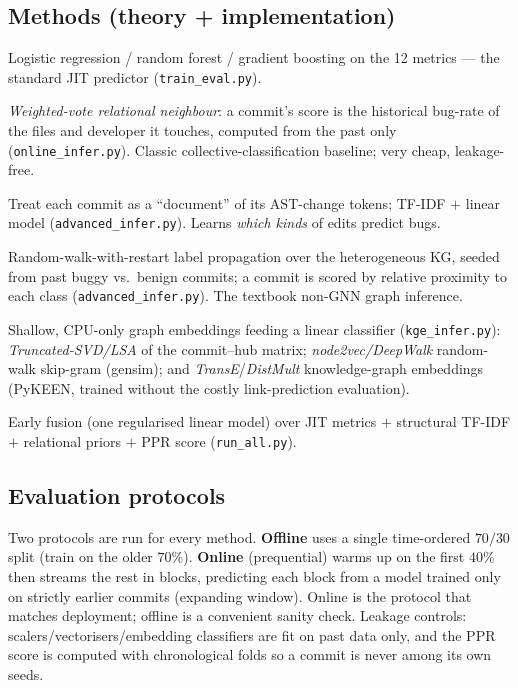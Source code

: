 \documentclass[11pt,a4paper]{article}
\begin{document}
\subsection{Methods (theory + implementation)}
\begin{description}[nosep,leftmargin=1.4em]
  \item[JIT-metrics baseline.] Logistic regression / random forest / gradient
        boosting on the 12 metrics --- the standard JIT predictor
        (\texttt{train\_eval.py}).
  \item[wvRN / relational priors.] \emph{Weighted-vote relational neighbour}: a
        commit's score is the historical bug-rate of the files and developer it
        touches, computed from the past only (\texttt{online\_infer.py}). Classic
        collective-classification baseline; very cheap, leakage-free.
  \item[Structural TF-IDF.] Treat each commit as a ``document'' of its AST-change
        tokens; TF-IDF $+$ linear model (\texttt{advanced\_infer.py}). Learns
        \emph{which kinds} of edits predict bugs.
  \item[Personalized PageRank (PPR).] Random-walk-with-restart label propagation
        over the heterogeneous KG, seeded from past buggy vs.\ benign commits;
        a commit is scored by relative proximity to each class
        (\texttt{advanced\_infer.py}). The textbook non-GNN graph inference.
  \item[KG embeddings.] Shallow, CPU-only graph embeddings feeding a linear
        classifier (\texttt{kge\_infer.py}): \emph{Truncated-SVD/LSA} of the
        commit--hub matrix; \emph{node2vec/DeepWalk} random-walk skip-gram
        (gensim); and \emph{TransE}/\emph{DistMult} knowledge-graph embeddings
        (PyKEEN, trained without the costly link-prediction evaluation).
  \item[Fusion.] Early fusion (one regularised linear model) over JIT metrics
        $+$ structural TF-IDF $+$ relational priors $+$ PPR score
        (\texttt{run\_all.py}).
\end{description}

\subsection{Evaluation protocols}
Two protocols are run for every method. \textbf{Offline} uses a single
time-ordered $70/30$ split (train on the older $70\%$). \textbf{Online}
(prequential) warms up on the first $40\%$ then streams the rest in blocks,
predicting each block from a model trained only on strictly earlier commits
(expanding window). Online is the protocol that matches deployment; offline is a
convenient sanity check. Leakage controls: scalers/vectorisers/embedding
classifiers are fit on past data only, and the PPR score is computed with
chronological folds so a commit is never among its own seeds.
\end{document}
